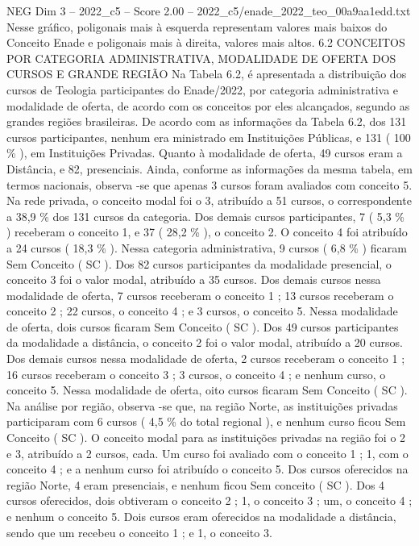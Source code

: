 \begin{textsample}{NEG Dim 3 – 2022\_c5 – Score 2.00 – 2022\_c5/enade\_2022\_teo\_00a9aa1edd.txt}
Nesse gráfico, poligonais mais à esquerda representam valores mais baixos do Conceito Enade e poligonais mais à direita, valores mais altos. 6.2 CONCEITOS POR CATEGORIA ADMINISTRATIVA, MODALIDADE DE OFERTA DOS CURSOS E GRANDE REGIÃO Na Tabela 6.2, é apresentada a distribuição dos cursos de Teologia participantes do Enade/2022, por categoria administrativa e modalidade de oferta, de acordo com os conceitos por eles alcançados, segundo as grandes regiões brasileiras.
De acordo com as informações da Tabela 6.2, dos 131 cursos participantes, nenhum era ministrado em Instituições Públicas, e 131 ( 100 \% ), em Instituições Privadas.
Quanto à modalidade de oferta, 49 cursos eram a Distância, e 82, presenciais.
Ainda, conforme as informações da mesma tabela, em termos nacionais, observa -se que apenas 3 cursos foram avaliados com conceito 5.
Na rede privada, o conceito modal foi o 3, atribuído a 51 cursos, o correspondente a 38,9 \% dos 131 cursos da categoria.
Dos demais cursos participantes, 7 ( 5,3 \% ) receberam o conceito 1, e 37 ( 28,2 \% ), o conceito 2.
O conceito 4 foi atribuído a 24 cursos ( 18,3 \% ).
Nessa categoria administrativa, 9 cursos ( 6,8 \% ) ficaram Sem Conceito ( SC ).
Dos 82 cursos participantes da modalidade presencial, o conceito 3 foi o valor modal, atribuído a 35 cursos.
Dos demais cursos nessa modalidade de oferta, 7 cursos receberam o conceito 1 ; 13 cursos receberam o conceito 2 ; 22 cursos, o conceito 4 ; e 3 cursos, o conceito 5.
Nessa modalidade de oferta, dois cursos ficaram Sem Conceito ( SC ).
Dos 49 cursos participantes da modalidade a distância, o conceito 2 foi o valor modal, atribuído a 20 cursos.
Dos demais cursos nessa modalidade de oferta, 2 cursos receberam o conceito 1 ; 16 cursos receberam o conceito 3 ; 3 cursos, o conceito 4 ; e nenhum curso, o conceito 5.
Nessa modalidade de oferta, oito cursos ficaram Sem Conceito ( SC ).
Na análise por região, observa -se que, na região Norte, as instituições privadas participaram com 6 cursos ( 4,5 \% do total regional ), e nenhum curso ficou Sem Conceito ( SC ).
O conceito modal para as instituições privadas na região foi o 2 e 3, atribuído a 2 cursos, cada.
Um curso foi avaliado com o conceito 1 ; 1, com o conceito 4 ; e a nenhum curso foi atribuído o conceito 5.
Dos cursos oferecidos na região Norte, 4 eram presenciais, e nenhum ficou Sem conceito ( SC ).
Dos 4 cursos oferecidos, dois obtiveram o conceito 2 ; 1, o conceito 3 ; um, o conceito 4 ; e nenhum o conceito 5.
Dois cursos eram oferecidos na modalidade a distância, sendo que um recebeu o conceito 1 ; e 1, o conceito 3.

\end{textsample}
